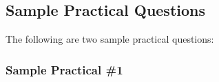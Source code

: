 \subsection{Sample Practical Questions}
%
%
%
%
%
%

The following are two sample practical questions:
\subsubsection{Sample Practical \#1}


